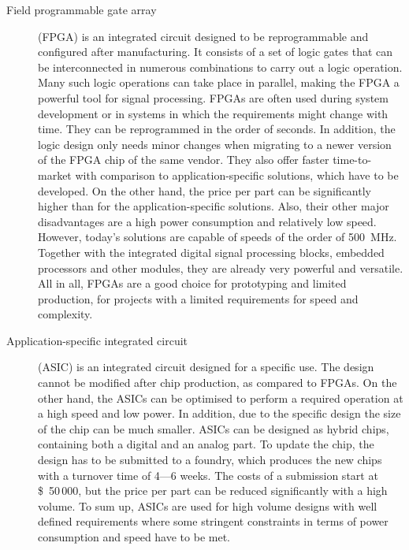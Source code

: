 \documentclass[twoside,12pt]{packages/mytustyle}  %
\begin{document}
\begin{description}
\item[Field programmable gate array] (FPGA) is an integrated circuit designed to be reprogrammable and configured after manufacturing. It consists of a set of logic gates that can be interconnected in numerous combinations to carry out a logic operation. Many such logic operations can take place in parallel, making the FPGA a powerful tool for signal processing. FPGAs are often used during system development or in systems in which the requirements might change with time. They can be reprogrammed in the order of seconds. In addition, the logic design only needs minor changes when migrating to a newer version of the FPGA chip of the same vendor. They also offer faster time-to-market with comparison to application-specific solutions, which have to be developed. On the other hand, the price per part can be significantly higher than for the application-specific solutions. Also, their other major disadvantages are a high power consumption and relatively low speed. However, today's solutions are capable of speeds of the order of 500~MHz. Together with the integrated digital signal processing blocks, embedded processors and other modules, they are already very powerful and versatile. All in all, FPGAs are a good choice for prototyping and limited production, for projects with a limited requirements for speed and complexity.

\item[Application-specific integrated circuit] (ASIC) is an integrated circuit designed for a specific use. The design cannot be modified after chip production, as compared to FPGAs. On the other hand, the ASICs can be optimised to perform a required operation at a high speed and low power. In addition, due to the specific design the size of the chip can be much smaller. ASICs can be designed as hybrid chips, containing both a digital and an analog part.  
To update the chip, the design has to be submitted to a foundry, which produces the new chips with a turnover time of 4---6 weeks. The costs of a submission start at \$~50\,000, but the price per part can be reduced significantly with a high volume. To sum up, ASICs are used for high volume designs with well defined requirements where some stringent constraints in terms of power consumption and speed have to be met.
\end{description} 
\end{document}
